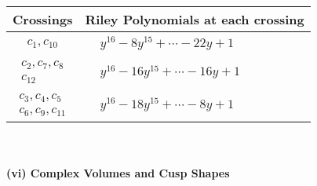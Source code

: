 \documentclass[1p]{elsarticle_modified}
\theoremstyle{definition}
\begin{document}
\begin{tabular}{m{50pt}|m{274pt}}
Crossings & \hspace{64pt}Riley Polynomials at each crossing \\
\hline $$\begin{aligned}c_{1},c_{10}\end{aligned}$$&$\begin{aligned}
&y^{16}-8 y^{15}+\cdots-22 y+1
\end{aligned}$\\
\hline $$\begin{aligned}c_{2},c_{7},c_{8}\\c_{12}\end{aligned}$$&$\begin{aligned}
&y^{16}-16 y^{15}+\cdots-16 y+1
\end{aligned}$\\
\hline $$\begin{aligned}c_{3},c_{4},c_{5}\\c_{6},c_{9},c_{11}\end{aligned}$$&$\begin{aligned}
&y^{16}-18 y^{15}+\cdots-8 y+1
\end{aligned}$\\
\hline
\end{tabular}\\~\\
\newpage\flushleft \textbf{(vi) Complex Volumes and Cusp Shapes}
\end{document}
